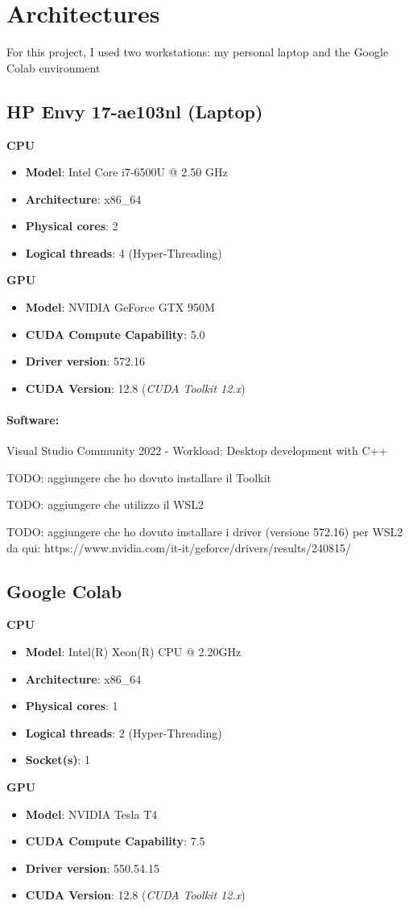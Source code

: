 \section{Architectures}
For this project, I used two workstations: my personal laptop and the Google Colab environment

\subsection{HP Envy 17-ae103nl (Laptop)}
\textbf{CPU}
\begin{itemize}
    \item \textbf{Model}: Intel Core i7-6500U @ 2.50 GHz
    \item \textbf{Architecture}: x86\_64
    \item \textbf{Physical cores}: 2
    \item \textbf{Logical threads}: 4 (Hyper-Threading)
\end{itemize}

\noindent
\textbf{GPU}
\begin{itemize}
    \item \textbf{Model}: NVIDIA GeForce GTX 950M
    \item \textbf{CUDA Compute Capability}: 5.0
    \item \textbf{Driver version}: 572.16
    \item \textbf{CUDA Version}: 12.8 (\textit{CUDA Toolkit 12.x})
\end{itemize}

\paragraph{Software:} Visual Studio Community 2022 - Workload: Desktop development with C++

TODO: aggiungere che ho dovuto installare il Toolkit

TODO: aggiungere che utilizzo il WSL2

TODO: aggiungere che ho dovuto installare i driver (versione 572.16) per WSL2 da qui: https://www.nvidia.com/it-it/geforce/drivers/results/240815/

\subsection{Google Colab}
\textbf{CPU}
\begin{itemize}
    \item \textbf{Model}: Intel(R) Xeon(R) CPU @ 2.20GHz
    \item \textbf{Architecture}: x86\_64
    \item \textbf{Physical cores}: 1
    \item \textbf{Logical threads}: 2 (Hyper-Threading)
    \item \textbf{Socket(s)}: 1
\end{itemize}

\noindent
\textbf{GPU}
\begin{itemize}
    \item \textbf{Model}: NVIDIA Tesla T4
    \item \textbf{CUDA Compute Capability}: 7.5
    \item \textbf{Driver version}: 550.54.15
    \item \textbf{CUDA Version}: 12.8 (\textit{CUDA Toolkit 12.x})
\end{itemize}